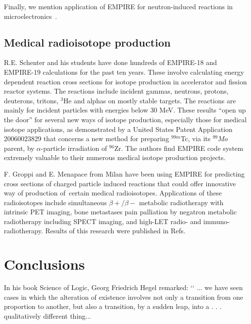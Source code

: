 \documentclass[twocolumn,amsmath,amssymb,10pt,groupedaddress,a4paper]{revtex4}
\begin{document}
Finally, we mention application of EMPIRE  for neutron-induced reactions in microelectronics~\cite{wrobel2005unc}.
\subsection{Medical radioisotope production}
R.E. Schenter and his students have done hundreds of EMPIRE-18 and EMPIRE-19 calculations for the past ten years.  These involve calculating energy dependent reaction cross sections for isotope production in accelerator and fission reactor systems.   The reactions include incident gammas, neutrons, protons, deuterons, tritons, $^3$He and alphas on mostly stable targets. The reactions are mainly for incident particles with energies below 30 MeV.  These results “open up the door” for several new ways of isotope production, especially those for medical isotope applications, as demonstrated by a United States Patent Application 20060023829 that concerns a new method for preparing $^{99m}$Tc, via its $^{99}Mo$ parent, by $\alpha$-particle irradiation of $^{96}$Zr. The authors find EMPIRE code system extremely valuable to their numerous medical isotope  production projects.

F. Groppi and E. Menapace from Milan have been using EMPIRE for predicting cross sections of charged particle induced reactions that could offer innovative way of production of certain medical radioisotopes. Applications of these radioisotopes include simultaneous $\beta+/\beta-$ metabolic radiotherapy with intrinsic PET imaging,  bone metastases pain palliation by negatron metabolic radiotherapy including SPECT imaging,  and high-LET radio- and immuno-radiotherapy. Results of this research were published in Refs.~\cite{Menapace:04, Menapace:05, Groppi:05, Groppi:05a, Groppi:06, Alfassi:06, Persico:06}


\section{Conclusions}

In his book Science of Logic, Georg Friedrich Hegel remarked:
‘‘
... we have seen cases in which the alteration of existence
involves not only a transition from one proportion to another,
but also a transition, by a sudden leap, into a . . . qualitatively
different thing...
\end{document}

